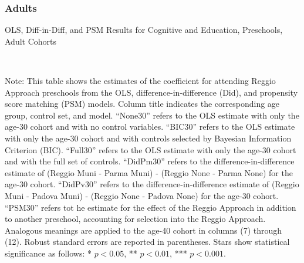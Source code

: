 \subsubsection{Adults}
\begin{landscape}

\begin{table}[H] \caption{OLS, Diff-in-Diff, and PSM Results for Cognitive and Education, Preschools, Adult Cohorts} \label{ols-E-reg}
\scalebox{0.80}{}
\vspace{1ex} \\
\footnotesize\raggedright{Note: This table shows the estimates of the coefficient for attending Reggio Approach preschools from the OLS, difference-in-difference (Did), and propensity score matching (PSM) models. Column title indicates the corresponding age group, control set, and model. ``None30'' refers to the OLS estimate with only the age-30 cohort and with no control variables. ``BIC30'' refers to the OLS estimate with only the age-30 cohort and with controls selected by Bayesian Information Criterion (BIC). ``Full30'' refers to the OLS estimate with only the age-30 cohort and with the full set of controls. ``DidPm30'' refers to the difference-in-difference estimate of (Reggio Muni - Parma Muni) - (Reggio None - Parma None) for the age-30 cohort. ``DidPv30'' refers to the difference-in-difference estimate of (Reggio Muni - Padova Muni) - (Reggio None - Padova None) for the age-30 cohort. ``PSM30'' refers tot he estimate for the effect of the Reggio Approach in addition to another preschool, accounting for selection into the Reggio Approach. Analogous meanings are applied to the age-40 cohort in columns (7) through (12). Robust standard errors are reported in parentheses. Stars show statistical significance as follows: * $p < 0.05$, ** $p < 0.01$, *** $p < 0.001$.}
\end{table}



\end{landscape}
